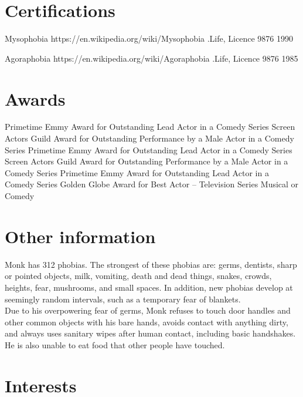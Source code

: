 \documentclass[]{mcec-cv}
\begin{document}
\section{Certifications}

\begin{mcecnlist}

\nitem
{Mysophobia}
{https://en.wikipedia.org/wiki/Mysophobia}
{.Life, Licence 9876}
{1990}

\nitem
{Agoraphobia}
{https://en.wikipedia.org/wiki/Agoraphobia}
{.Life, Licence 9876}
{1985}
    
\end{mcecnlist}

\section{Awards}

\begin{mcecslist}

 {Primetime Emmy Award for Outstanding Lead Actor in a Comedy Series}
 {Screen Actors Guild Award for Outstanding Performance by a Male Actor in a Comedy Series}
 {Primetime Emmy Award for Outstanding Lead Actor in a Comedy Series}
 {Screen Actors Guild Award for Outstanding Performance by a Male Actor in a Comedy Series}
 {Primetime Emmy Award for Outstanding Lead Actor in a Comedy Series}
 {Golden Globe Award for Best Actor – Television Series Musical or Comedy}

\end{mcecslist}

\section{Other information}
Monk has 312 phobias. The strongest of these phobias are: germs, dentists, sharp or pointed objects, milk, vomiting, death and dead things, snakes, crowds, heights, fear, mushrooms, and small spaces. In addition, new phobias develop at seemingly random intervals, such as a temporary fear of blankets.\\
Due to his overpowering fear of germs, Monk refuses to touch door handles and other common objects with his bare hands, avoids contact with anything dirty, and always uses sanitary wipes after human contact, including basic handshakes. He is also unable to eat food that other people have touched.

\section{Interests}

\end{document}
